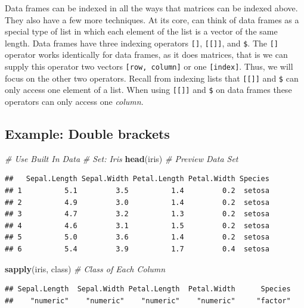 \documentclass[
]{book}
\newenvironment{Shaded}{\begin{snugshade}}{\end{snugshade}}
\newcommand{\CommentTok}[1]{\textcolor[rgb]{0.56,0.35,0.01}{\textit{#1}}}
\newcommand{\KeywordTok}[1]{\textcolor[rgb]{0.13,0.29,0.53}{\textbf{#1}}}
\newcommand{\NormalTok}[1]{#1}
\begin{document}
Data frames can be indexed in all the ways that matrices can be indexed above. They also have a few more techniques. At its core, can think of data frames as a special type of list in which each element of the list is a vector of the same length. Data frames have three indexing operators \texttt{{[}{]}}, \texttt{{[}{[}{]}{]}}, and \texttt{\$}. The \texttt{{[}{]}} operator works identically for data frames, as it does matrices, that is we can supply this operator two vectors \texttt{{[}row,\ column{]}} or one \texttt{{[}index{]}}. Thus, we will focus on the other two operators. Recall from indexing lists that \texttt{{[}{[}{]}{]}} and \texttt{\$} can only access one element of a list. When using \texttt{{[}{[}{]}{]}} and \texttt{\$} on data frames these operators can only access one \emph{column}.

\hypertarget{example-double-brackets}{%
\subsection*{Example: Double brackets}\label{example-double-brackets}}

\begin{Shaded}
\begin{Highlighting}[]
\CommentTok{# Use Built In Data}
\CommentTok{# Set: Iris}
\KeywordTok{head}\NormalTok{(iris)  }\CommentTok{# Preview Data Set}
\end{Highlighting}
\end{Shaded}

\begin{verbatim}
##   Sepal.Length Sepal.Width Petal.Length Petal.Width Species
## 1          5.1         3.5          1.4         0.2  setosa
## 2          4.9         3.0          1.4         0.2  setosa
## 3          4.7         3.2          1.3         0.2  setosa
## 4          4.6         3.1          1.5         0.2  setosa
## 5          5.0         3.6          1.4         0.2  setosa
## 6          5.4         3.9          1.7         0.4  setosa
\end{verbatim}

\begin{Shaded}
\begin{Highlighting}[]
\KeywordTok{sapply}\NormalTok{(iris, class)  }\CommentTok{# Class of Each Column }
\end{Highlighting}
\end{Shaded}

\begin{verbatim}
## Sepal.Length  Sepal.Width Petal.Length  Petal.Width      Species 
##    "numeric"    "numeric"    "numeric"    "numeric"     "factor"
\end{verbatim}
\end{document}
